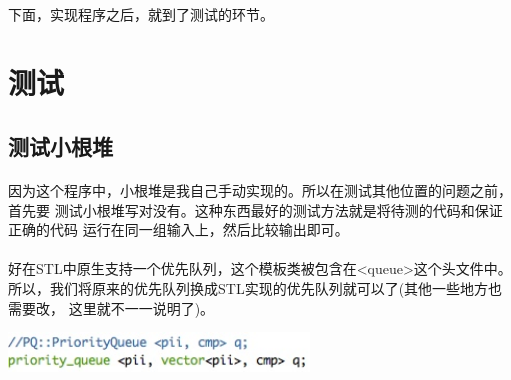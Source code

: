\documentclass{article}
\begin{document}
		\paragraph{}
			下面，实现程序之后，就到了测试的环节。
\section{测试}
	\subsection{测试小根堆}
		\paragraph{}
			因为这个程序中，小根堆是我自己手动实现的。所以在测试其他位置的问题之前，首先要
			测试小根堆写对没有。这种东西最好的测试方法就是将待测的代码和保证正确的代码
			运行在同一组输入上，然后比较输出即可。
		\paragraph{}
			好在STL中原生支持一个优先队列，这个模板类被包含在<queue>这个头文件中。
			所以，我们将原来的优先队列换成STL实现的优先队列就可以了(其他一些地方也需要改，
			这里就不一一说明了)。
			\begin{center}
			\includegraphics[width = 8cm]{change.jpeg}\\
			\end{center}
\end{document}
